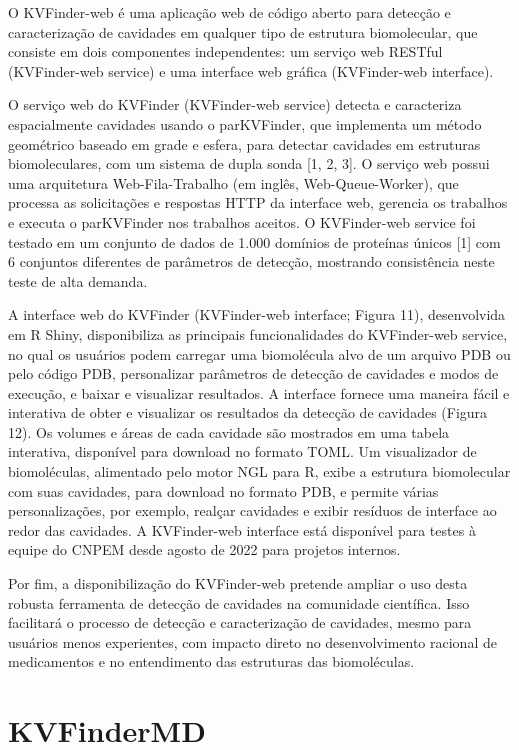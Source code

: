 \documentclass[Portugues]{phdquali}
\begin{document}
O KVFinder-web é uma aplicação web de código aberto para detecção e caracterização de cavidades em qualquer tipo de estrutura biomolecular, que consiste em dois componentes independentes: um serviço web RESTful (KVFinder-web service) e uma interface web gráfica (KVFinder-web interface).  

O serviço web do KVFinder (KVFinder-web service) detecta e caracteriza espacialmente cavidades usando o parKVFinder, que implementa um método geométrico baseado em grade e esfera, para detectar cavidades em estruturas biomoleculares, com um sistema de dupla sonda [1, 2, 3]. O serviço web possui uma arquitetura Web-Fila-Trabalho (em inglês, Web-Queue-Worker), que processa as solicitações e respostas HTTP da interface web, gerencia os trabalhos e executa o parKVFinder nos trabalhos aceitos. O KVFinder-web service foi testado em um conjunto de dados de 1.000 domínios de proteínas únicos [1] com 6 conjuntos diferentes de parâmetros de detecção, mostrando consistência neste teste de alta demanda. 

A interface web do KVFinder (KVFinder-web interface; Figura 11), desenvolvida em R Shiny, disponibiliza as principais funcionalidades do KVFinder-web service, no qual os usuários podem carregar uma biomolécula alvo de um arquivo PDB ou pelo código PDB, personalizar parâmetros de detecção de cavidades e modos de execução, e baixar e visualizar resultados. A interface fornece uma maneira fácil e interativa de obter e visualizar os resultados da detecção de cavidades (Figura 12). Os volumes e áreas de cada cavidade são mostrados em uma tabela interativa, disponível para download no formato TOML. Um visualizador de biomoléculas, alimentado pelo motor NGL para R, exibe a estrutura biomolecular com suas cavidades, para download no formato PDB, e permite várias personalizações, por exemplo, realçar cavidades e exibir resíduos de interface ao redor das cavidades. A KVFinder-web interface está disponível para testes à equipe do CNPEM desde agosto de 2022 para projetos internos. 

Por fim, a disponibilização do KVFinder-web pretende ampliar o uso desta robusta ferramenta de detecção de cavidades na comunidade científica. Isso facilitará o processo de detecção e caracterização de cavidades, mesmo para usuários menos experientes, com impacto direto no desenvolvimento racional de medicamentos e no entendimento das estruturas das biomoléculas. 

\section{KVFinderMD}
\end{document}
